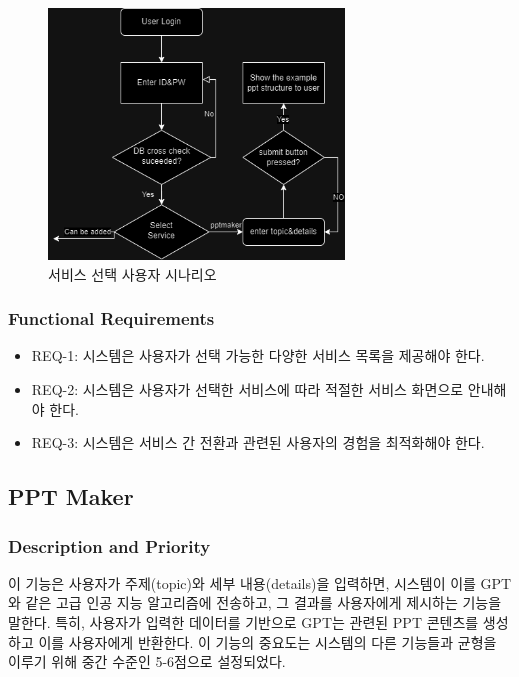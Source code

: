\documentclass[a4paper, 12pt]{article}
\begin{document}
\begin{figure}[H]
\centering
\includegraphics[width=0.7\textwidth]{img/computer_engineering.drawio.png}
\caption{서비스 선택 사용자 시나리오}
\label{fig:computer_engineering}
\end{figure}

\subsubsection{Functional Requirements}
\begin{itemize}
  \item REQ-1: 시스템은 사용자가 선택 가능한 다양한 서비스 목록을 제공해야 한다.
  \item REQ-2: 시스템은 사용자가 선택한 서비스에 따라 적절한 서비스 화면으로 안내해야 한다.
  \item REQ-3: 시스템은 서비스 간 전환과 관련된 사용자의 경험을 최적화해야 한다.
\end{itemize}


\subsection{PPT Maker}

\subsubsection{Description and Priority}
이 기능은 사용자가 주제(topic)와 세부 내용(details)을 입력하면, 시스템이 이를 GPT와 같은 고급 인공 지능 알고리즘에 전송하고, 그 결과를 사용자에게 제시하는 기능을 말한다. 특히, 사용자가 입력한 데이터를 기반으로 GPT는 관련된 PPT 콘텐츠를 생성하고 이를 사용자에게 반환한다. 이 기능의 중요도는 시스템의 다른 기능들과 균형을 이루기 위해 중간 수준인 5-6점으로 설정되었다.
\end{document}

